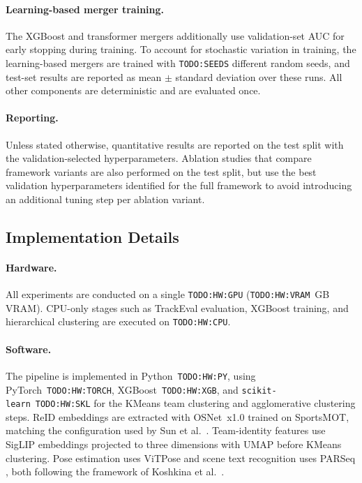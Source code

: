 \paragraph{Learning-based merger training.} The XGBoost and transformer mergers additionally use validation-set AUC for early stopping during training. To account for stochastic variation in training, the learning-based mergers are trained with \texttt{TODO:SEEDS} different random seeds, and test-set results are reported as mean $\pm$ standard deviation over these runs. All other components are deterministic and are evaluated once.

\paragraph{Reporting.} Unless stated otherwise, quantitative results are reported on the test split with the validation-selected hyperparameters. Ablation studies that compare framework variants are also performed on the test split, but use the best validation hyperparameters identified for the full framework to avoid introducing an additional tuning step per ablation variant.

\subsection{Implementation Details}\label{subsec:implementation}

\paragraph{Hardware.} All experiments are conducted on a single \texttt{TODO:HW:GPU} (\texttt{TODO:HW:VRAM}~GB VRAM). CPU-only stages such as TrackEval evaluation, XGBoost training, and hierarchical clustering are executed on \texttt{TODO:HW:CPU}.

\paragraph{Software.} The pipeline is implemented in Python~\texttt{TODO:HW:PY}, using PyTorch~\texttt{TODO:HW:TORCH}, XGBoost~\texttt{TODO:HW:XGB}, and \texttt{scikit-learn}~\texttt{TODO:HW:SKL} for the KMeans team clustering and agglomerative clustering steps. ReID embeddings are extracted with OSNet~x1.0 \cite{osnet} trained on SportsMOT, matching the configuration used by Sun et al.\ \cite{gta}. Team-identity features use SigLIP embeddings projected to three dimensions with UMAP before KMeans clustering. Pose estimation uses ViTPose \cite{vitpose} and scene text recognition uses PARSeq \cite{parseq}, both following the framework of Koshkina et al.\ \cite{jersey-prediction}.


